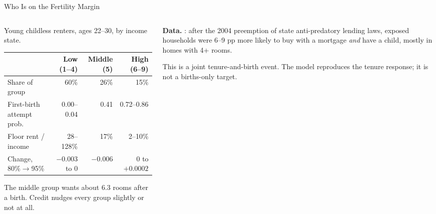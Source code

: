 \begin{frame}[t]{Who Is on the Fertility Margin}
\footnotesize
\begin{columns}[T,onlytextwidth]
\begin{column}{0.60\textwidth}
Young childless renters, ages 22--30, by income state.
\smallskip

\scriptsize\setlength{\tabcolsep}{3pt}
\renewcommand{\arraystretch}{1.12}
\begin{tabular}{@{}lrrr@{}}
\toprule
 & Low (1--4) & Middle (5) & High (6--9) \\
\midrule
Share of group & 60\% & 26\% & 15\% \\
First-birth attempt prob. & 0.00--0.04 & 0.41 & 0.72--0.86 \\
Floor rent / income & 28--128\% & 17\% & 2--10\% \\
Change, 80\%$\to$95\% & $-0.003$ to 0 & $-0.006$ & 0 to $+0.0002$ \\
\bottomrule
\end{tabular}
\smallskip

\scriptsize The middle group wants about 6.3 rooms after a birth. Credit nudges every group slightly or not at all.
\end{column}
\begin{column}{0.36\textwidth}
\textbf{Data.} : after the 2004 preemption of state anti-predatory lending laws, exposed
households were 6--9 pp more likely to buy with a mortgage \emph{and} have a child, mostly in homes with 4+ rooms.
\medskip

This is a joint tenure-and-birth event. The model reproduces the tenure response; it is not a births-only target.
\end{column}
\end{columns}
\vfill
{}
\end{frame}


